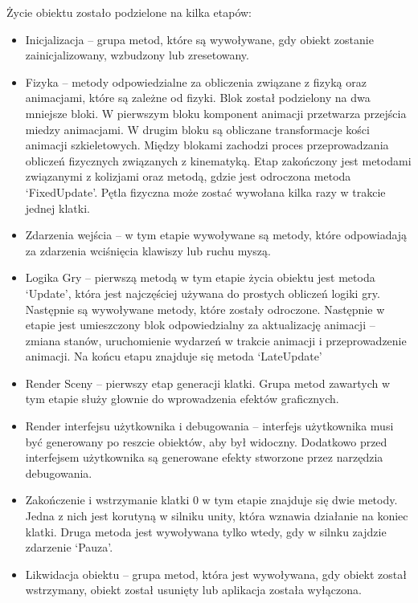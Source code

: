 \documentclass[12pt,twoside]{article}
\begin{document}
Życie obiektu zostało podzielone na kilka etapów:
\begin{itemize}
\item Inicjalizacja – grupa metod, które są wywoływane, gdy obiekt zostanie
zainicjalizowany, wzbudzony lub zresetowany.
\item Fizyka – metody odpowiedzialne za obliczenia związane z fizyką oraz
animacjami, które są zależne od fizyki. Blok został podzielony na dwa mniejsze
bloki. W pierwszym bloku komponent animacji przetwarza przejścia miedzy
animacjami. W drugim bloku są obliczane transformacje kości animacji
szkieletowych. Między blokami zachodzi proces przeprowadzania obliczeń
fizycznych związanych z kinematyką. Etap zakończony jest metodami związanymi z
kolizjami oraz metodą, gdzie jest odroczona metoda ‘FixedUpdate’. Pętla fizyczna
może zostać wywołana kilka razy w trakcie jednej klatki. 
\item Zdarzenia wejścia – w tym etapie wywoływane są metody, które odpowiadają
za zdarzenia wciśnięcia klawiszy lub ruchu myszą. 
\item Logika Gry – pierwszą metodą w tym etapie życia obiektu jest metoda
‘Update’, która jest najczęściej używana do prostych obliczeń logiki gry.
Następnie są wywoływane metody, które zostały odroczone. Następnie w etapie jest
umieszczony blok odpowiedzialny za aktualizację animacji – zmiana stanów,
uruchomienie wydarzeń w trakcie animacji i przeprowadzenie animacji. Na końcu
etapu znajduje się metoda ‘LateUpdate’
\item Render Sceny – pierwszy etap generacji klatki. Grupa metod zawartych w tym
etapie służy głownie do wprowadzenia efektów graficznych.
\item Render interfejsu użytkownika i debugowania – interfejs użytkownika musi
być generowany po reszcie obiektów, aby był widoczny. Dodatkowo przed
interfejsem użytkownika są generowane efekty stworzone przez narzędzia
debugowania. 
\item Zakończenie i wstrzymanie klatki 0 w tym etapie znajduje się dwie metody.
Jedna z nich jest korutyną w silniku unity, która wznawia działanie na koniec
klatki. Druga metoda jest wywoływana tylko wtedy, gdy w silnku zajdzie zdarzenie
‘Pauza’.
\item Likwidacja obiektu – grupa metod, która jest wywoływana, gdy obiekt został
wstrzymany, obiekt został usunięty lub aplikacja została wyłączona. 
\end{itemize}
\end{document}
